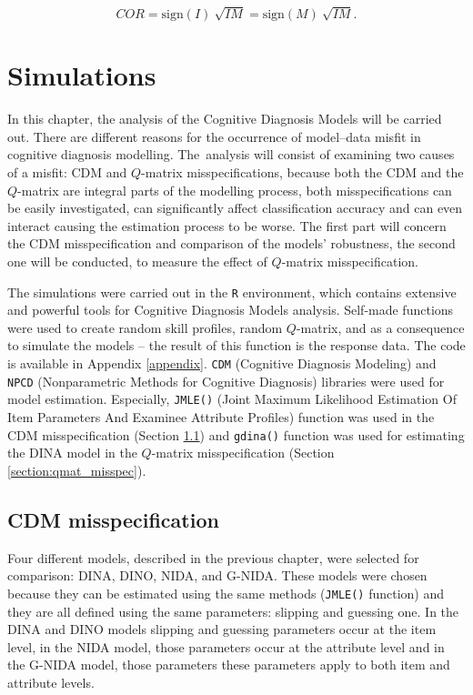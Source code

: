 \documentclass[english]{pwr_wmat_praca_dyplomowa}
\theoremstyle{plain}
\theoremstyle{definition}
\numberwithin{theorem}{chapter}
\begin{document}
$$ COR = \text{sign}(I)\ \sqrt{IM} = \text{sign}(M)\ \sqrt{IM}. $$


\chapter{Simulations}\label{chapter:simulations}

In this chapter, the analysis of the Cognitive Diagnosis Models will be carried out. There are different reasons for the occurrence of model–data misﬁt in cognitive diagnosis modelling.  The~analysis will consist of examining two causes of a misﬁt: CDM and $Q$-matrix misspeciﬁcations,  because both the CDM and the $Q$-matrix are integral parts of the modelling process, both misspeciﬁcations can be easily investigated, can significantly affect classiﬁcation accuracy and can even interact causing the estimation process to be worse. The first part will concern the CDM misspecification and comparison of the models' robustness, the second one will be conducted, to measure the effect of $Q$-matrix misspecification. 

The simulations were carried out in the \texttt{R} environment, which contains extensive and powerful tools for Cognitive Diagnosis Models analysis. Self-made functions were used to create random skill profiles, random $Q$-matrix, and as a consequence to simulate the models -- the result of this function is the response data. The code is available in Appendix \ref{appendix}. \texttt{CDM} (Cognitive Diagnosis Modeling) and \texttt{NPCD} (Nonparametric Methods for Cognitive Diagnosis) libraries were used for model estimation. Especially, \texttt{JMLE()} (Joint Maximum Likelihood Estimation Of Item Parameters And Examinee Attribute Profiles) function was used in the CDM misspecification (Section \ref{section:cdm_misspec}) and \texttt{gdina()} function was used for estimating the DINA model in the $Q$-matrix misspecification (Section \ref{section:qmat_misspec}).

\section{CDM misspecification}\label{section:cdm_misspec}

Four different models, described in the previous chapter, were selected for comparison: DINA, DINO, NIDA, and G-NIDA. These models were chosen because they can be estimated using the same methods (\texttt{JMLE()} function) and they are all defined using the same parameters: slipping and guessing one. In the DINA and DINO models slipping and guessing parameters occur at the item level, in the NIDA model, those parameters occur at the attribute level and in the G-NIDA model, those parameters these parameters apply to both item and attribute levels. 
\end{document}
